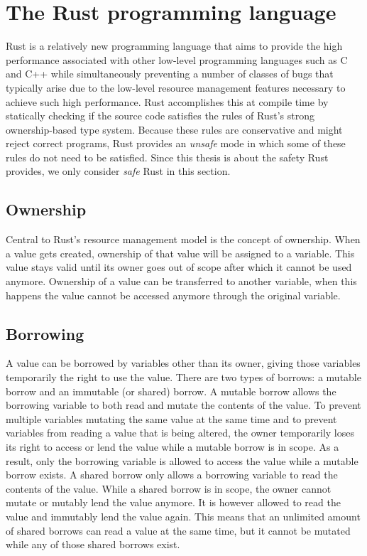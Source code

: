 \section{The Rust programming language}
Rust is a relatively new programming language that aims to provide the high performance associated with other low-level programming languages such as C and C++ while simultaneously preventing a number of classes of bugs that typically arise due to the low-level resource management features necessary to achieve such high performance. Rust accomplishes this at compile time by statically checking if the source code satisfies the rules of Rust's strong ownership-based type system. Because these rules are conservative and might reject correct programs, Rust provides an \textit{unsafe} mode in which some of these rules do not need to be satisfied. Since this thesis is about the safety Rust provides, we only consider \textit{safe} Rust in this section.

\subsection{Ownership}
Central to Rust's resource management model is the concept of ownership. When a value gets created, ownership of that value will be assigned to a variable. This value stays valid until its owner goes out of scope after which it cannot be used anymore. Ownership of a value can be transferred to another variable, when this happens the value cannot be accessed anymore through the original variable.

\subsection{Borrowing}
\label{subsec:borrowing}
A value can be borrowed by variables other than its owner, giving those variables temporarily the right to use the value. There are two types of borrows: a mutable borrow and an immutable (or shared) borrow. 
A mutable borrow allows the borrowing variable to both read and mutate the contents of the value. To prevent multiple variables mutating the same value at the same time and to prevent variables from reading a value that is being altered, the owner temporarily loses its right to access or lend the value while a mutable borrow is in scope. As a result, only the borrowing variable is allowed to access the value while a mutable borrow exists.
A shared borrow only allows a borrowing variable to read the contents of the value. While a shared borrow is in scope, the owner cannot mutate or mutably lend the value anymore. It is however allowed to read the value and immutably lend the value again. This means that an unlimited amount of shared borrows can read a value at the same time, but it cannot be mutated while any of those shared borrows exist.

